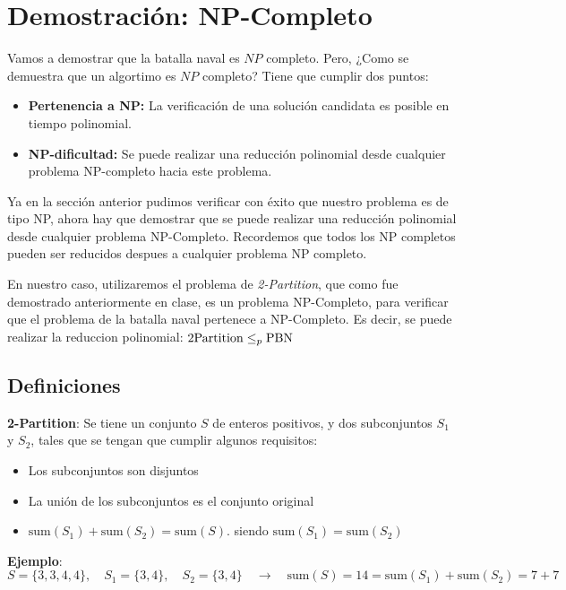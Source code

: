 \section{Demostración: NP-Completo}

Vamos a demostrar que la batalla naval es $NP$ completo. Pero, ¿Como se demuestra que un algortimo es $NP$ completo? Tiene que cumplir dos puntos: 

\begin{itemize}
    \item \textbf{Pertenencia a NP:} La verificación de una solución candidata es posible en tiempo polinomial.
    \item \textbf{NP-dificultad:} Se puede realizar una reducción polinomial desde cualquier problema NP-completo hacia este problema.
\end{itemize}

Ya en la sección anterior pudimos verificar con éxito que nuestro problema es de tipo NP, ahora hay que demostrar que se puede realizar una reducción polinomial desde cualquier problema NP-Completo. Recordemos que todos los NP completos pueden ser reducidos despues a cualquier problema NP completo. 

En nuestro caso, utilizaremos el problema de \textit{2-Partition}, que como fue demostrado anteriormente en clase, es un problema NP-Completo, para verificar que el problema de la batalla naval pertenece a NP-Completo. Es decir, se puede realizar la reduccion polinomial: $\text{2\-Partition} \leq_p \text{PBN}$

\subsection*{Definiciones}

\textbf{2-Partition}: Se tiene un conjunto $S$ de enteros positivos, y dos subconjuntos $S_1$ y $S_2$, tales que se tengan que cumplir algunos requisitos:
\begin{itemize}
    \item Los subconjuntos son disjuntos
    \item La unión de los subconjuntos es el conjunto original
    \item $\text{sum}(S_1) + \text{sum}(S_2) = \text{sum}(S)$. siendo $\text{sum}(S_1) = \text{sum}(S_2)$
\end{itemize}

\textbf{Ejemplo}:
$S = \{3, 3, 4, 4\}, \quad S_1 = \{3, 4\}, \quad S_2 = \{3, 4\} \quad \rightarrow \quad \text{sum}(S) = 14 = \text{sum}(S_1) + \text{sum}(S_2) = 7 + 7$

